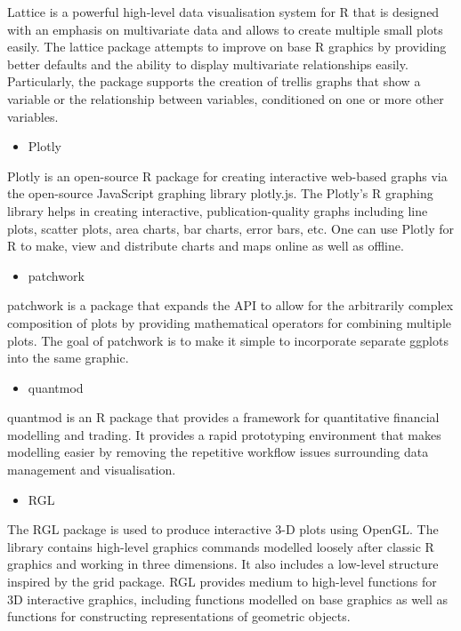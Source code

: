 \documentclass[
]{report}
\providecommand{\tightlist}{%
  \setlength{\itemsep}{0pt}\setlength{\parskip}{0pt}}
\begin{document}
Lattice is a powerful high-level data visualisation system for R that is designed with an emphasis on multivariate data and allows to create multiple small plots easily. The lattice package attempts to improve on base R graphics by providing better defaults and the ability to display multivariate relationships easily. Particularly, the package supports the creation of trellis graphs that show a variable or the relationship between variables, conditioned on one or more other variables.

\begin{itemize}
\tightlist
\item
  Plotly
\end{itemize}

Plotly is an open-source R package for creating interactive web-based graphs via the open-source JavaScript graphing library plotly.js. The Plotly's R graphing library helps in creating interactive, publication-quality graphs including line plots, scatter plots, area charts, bar charts, error bars, etc. One can use Plotly for R to make, view and distribute charts and maps online as well as offline.

\begin{itemize}
\tightlist
\item
  patchwork
\end{itemize}

patchwork is a package that expands the API to allow for the arbitrarily complex composition of plots by providing mathematical operators for combining multiple plots. The goal of patchwork is to make it simple to incorporate separate ggplots into the same graphic.

\begin{itemize}
\tightlist
\item
  quantmod
\end{itemize}

quantmod is an R package that provides a framework for quantitative financial modelling and trading. It provides a rapid prototyping environment that makes modelling easier by removing the repetitive workflow issues surrounding data management and visualisation.

\begin{itemize}
\tightlist
\item
  RGL
\end{itemize}

The RGL package is used to produce interactive 3-D plots using OpenGL. The library contains high-level graphics commands modelled loosely after classic R graphics and working in three dimensions. It also includes a low-level structure inspired by the grid package. RGL provides medium to high-level functions for 3D interactive graphics, including functions modelled on base graphics as well as functions for constructing representations of geometric objects.
\end{document}
